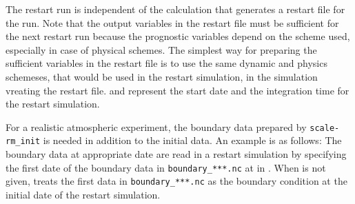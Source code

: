 The restart run is independent of the calculation that generates a restart file for the run.
Note that the output variables in the restart file must be sufficient for the next restart run because the prognostic variables depend on the scheme used, especially in case of physical schemes.
The simplest way for preparing the sufficient variables in the restart file is
to use the same dynamic and physics schemeses, that would be used in the restart simulation, in the simulation vreating the restart file.
 and  represent the start date and the integration time for the restart simulation.

For a realistic atmospheric experiment, the boundary data prepared by \verb|scale-rm_init| is needed in addition to the initial data. An example is as follows:
The boundary data at appropriate date are read in a restart simulation by specifying the first date of the boundary data in \verb|boundary_***.nc|  at  in . When  is not given, \scalerm treats the first data in \verb|boundary_***.nc|  as the boundary condition at the initial date of the restart simulation.

